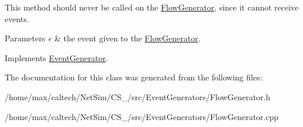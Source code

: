 \-This method should never be called on the \hyperlink{classFlowGenerator}{\-Flow\-Generator}, since it cannot receive events. 


\begin{DoxyParams}{\-Parameters}
{\em e} & the event given to the \hyperlink{classFlowGenerator}{\-Flow\-Generator}. \\
\hline
\end{DoxyParams}


\-Implements \hyperlink{classEventGenerator_a7448c87e533a9b38c20d914fa6a13c8e}{\-Event\-Generator}.



\-The documentation for this class was generated from the following files\-:\begin{DoxyCompactItemize}
\item 
/home/max/caltech/\-Net\-Sim/\-C\-S\-\_/src/\-Event\-Generators/\-Flow\-Generator.\-h\item 
/home/max/caltech/\-Net\-Sim/\-C\-S\-\_/src/\-Event\-Generators/\-Flow\-Generator.\-cpp\end{DoxyCompactItemize}
